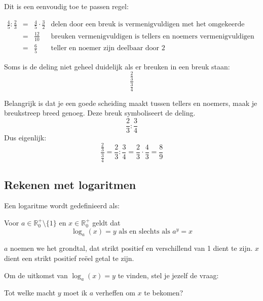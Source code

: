 Dit is een eenvoudig toe te passen regel:

\begin{equation*}
\begin{array}{cclr}
\frac{4}{5} : \frac{2}{3} &=& \frac{4}{5} \cdot \frac{3}{2} & \text{delen door een breuk is vermenigvuldigen met het omgekeerde van die breuk} \\
&=& \frac{12}{10} & \text{breuken vermenigvuldigen is tellers en noemers vermenigvuldigen} \\
&=& \frac{6}{5} & \text{teller en noemer zijn deelbaar door 2}
\end{array}
\end{equation*}

Soms is de deling niet geheel duidelijk als er breuken in een breuk staan:
\begin{equation*}
\frac{\frac{2}{3}}{\frac{3}{4}}
\end{equation*}

Belangrijk is dat je een goede scheiding maakt tussen tellers en noemers, maak je breukstreep breed genoeg. Deze breuk symboliseert de deling.
\begin{equation*}
\frac{2}{3}:\frac{3}{4}
\end{equation*}
Dus eigenlijk:
\begin{equation*}
\frac{\frac{2}{3}}{\frac{3}{4}}=\frac{2}{3}:\frac{3}{4}=\frac{2}{3} \cdot \frac{4}{3} = \frac{8}{9}
\end{equation*}

\subsection{Rekenen met logaritmen}
Een logaritme wordt gedefinieerd als:


\begin{definitie}
	Voor $a\in \mathbb{R}_0^+\setminus\{1\}$ en $x\in \mathbb{R}_0^+$ geldt dat
	\begin{equation*}
	\log_{a}(x) = y \text{ als en slechts als } a^y=x
	\end{equation*}
\end{definitie}

$a$ noemen we het grondtal, dat strikt positief en verschillend van 1 dient te zijn. $x$ dient een strikt positief re\"eel getal te zijn.

Om de uitkomst van $\log_{a}(x) = y$ te vinden, stel je jezelf de vraag:

Tot welke macht $y$ moet ik $a$ verheffen om $x$ te bekomen?

